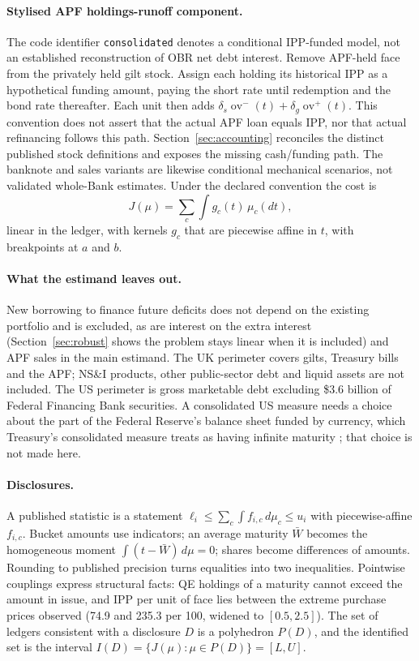 \documentclass[11pt,a4paper]{article}
\theoremstyle{remark}
\newcommand{\ov}{\operatorname{ov}}
\begin{document}
\paragraph{Stylised APF holdings-runoff component.} The code identifier \texttt{consolidated} denotes a conditional IPP-funded model, not an established reconstruction of OBR net debt interest. Remove APF-held face from the privately held gilt stock. Assign each holding its historical IPP as a hypothetical funding amount, paying the short rate until redemption and the bond rate thereafter. Each unit then adds $\delta_s\ov^-(t)+\delta_g\ov^+(t)$. This convention does not assert that the actual APF loan equals IPP, nor that actual refinancing follows this path. Section~\ref{sec:accounting} reconciles the distinct published stock definitions and exposes the missing cash/funding path. The banknote and sales variants are likewise conditional mechanical scenarios, not validated whole-Bank estimates. Under the declared convention the cost is
\begin{equation}\label{eq:J}
J(\mu)=\sum_c \int g_c(t)\,\mu_c(dt),
\end{equation}
linear in the ledger, with kernels $g_c$ that are piecewise affine in $t$, with breakpoints at $a$ and $b$.

\paragraph{What the estimand leaves out.} New borrowing to finance future deficits does not depend on the existing portfolio and is excluded, as are interest on the extra interest (Section~\ref{sec:robust} shows the problem stays linear when it is included) and APF sales in the main estimand. The UK perimeter covers gilts, Treasury bills and the APF; NS\&I products, other public-sector debt and liquid assets are not included. The US perimeter is gross marketable debt excluding \$3.6 billion of Federal Financing Bank securities. A consolidated US measure needs a choice about the part of the Federal Reserve's balance sheet funded by currency, which Treasury's consolidated measure treats as having infinite maturity \citep{TBAC2026}; that choice is not made here.

\paragraph{Disclosures.} A published statistic is a statement $\ell_i\le\sum_c\int f_{i,c}\,d\mu_c\le u_i$ with piecewise-affine $f_{i,c}$. Bucket amounts use indicators; an average maturity $\bar W$ becomes the homogeneous moment $\int (t-\bar W)\,d\mu=0$; shares become differences of amounts. Rounding to published precision turns equalities into two inequalities. Pointwise couplings express structural facts: QE holdings of a maturity cannot exceed the amount in issue, and IPP per unit of face lies between the extreme purchase prices observed (74.9 and 235.3 per 100, widened to $[0.5,2.5]$). The set of ledgers consistent with a disclosure $D$ is a polyhedron $P(D)$, and the identified set is the interval $I(D)=\{J(\mu):\mu\in P(D)\}=[L,U]$.
\end{document}
